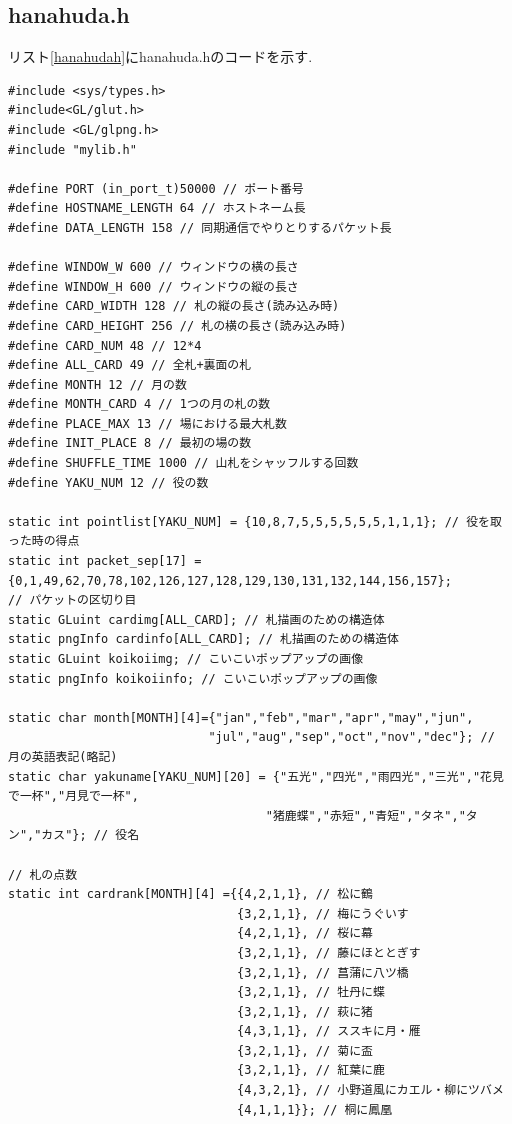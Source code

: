 \documentclass[a4j]{jarticle}
\begin{document}
    \subsection{hanahuda.h}
    リスト\ref{hanahudah}にhanahuda.hのコードを示す.
    \begin{lstlisting}[basicstyle=\ttfamily\footnotesize, frame=single,label=hanahudah,caption=hanahuda.h]
#include <sys/types.h>
#include<GL/glut.h>
#include <GL/glpng.h>
#include "mylib.h"

#define PORT (in_port_t)50000 // ポート番号
#define HOSTNAME_LENGTH 64 // ホストネーム長
#define DATA_LENGTH 158 // 同期通信でやりとりするパケット長

#define WINDOW_W 600 // ウィンドウの横の長さ
#define WINDOW_H 600 // ウィンドウの縦の長さ
#define CARD_WIDTH 128 // 札の縦の長さ(読み込み時)
#define CARD_HEIGHT 256 // 札の横の長さ(読み込み時)
#define CARD_NUM 48 // 12*4
#define ALL_CARD 49 // 全札+裏面の札
#define MONTH 12 // 月の数
#define MONTH_CARD 4 // 1つの月の札の数
#define PLACE_MAX 13 // 場における最大札数
#define INIT_PLACE 8 // 最初の場の数
#define SHUFFLE_TIME 1000 // 山札をシャッフルする回数
#define YAKU_NUM 12 // 役の数

static int pointlist[YAKU_NUM] = {10,8,7,5,5,5,5,5,5,1,1,1}; // 役を取った時の得点
static int packet_sep[17] ={0,1,49,62,70,78,102,126,127,128,129,130,131,132,144,156,157}; 
// パケットの区切り目  
static GLuint cardimg[ALL_CARD]; // 札描画のための構造体
static pngInfo cardinfo[ALL_CARD]; // 札描画のための構造体
static GLuint koikoiimg; // こいこいポップアップの画像
static pngInfo koikoiinfo; // こいこいポップアップの画像

static char month[MONTH][4]={"jan","feb","mar","apr","may","jun",
                            "jul","aug","sep","oct","nov","dec"}; // 月の英語表記(略記)
static char yakuname[YAKU_NUM][20] = {"五光","四光","雨四光","三光","花見で一杯","月見で一杯",
                                    "猪鹿蝶","赤短","青短","タネ","タン","カス"}; // 役名

// 札の点数
static int cardrank[MONTH][4] ={{4,2,1,1}, // 松に鶴
                                {3,2,1,1}, // 梅にうぐいす
                                {4,2,1,1}, // 桜に幕
                                {3,2,1,1}, // 藤にほととぎす
                                {3,2,1,1}, // 菖蒲に八ツ橋
                                {3,2,1,1}, // 牡丹に蝶
                                {3,2,1,1}, // 萩に猪
                                {4,3,1,1}, // ススキに月・雁
                                {3,2,1,1}, // 菊に盃
                                {3,2,1,1}, // 紅葉に鹿
                                {4,3,2,1}, // 小野道風にカエル・柳にツバメ
                                {4,1,1,1}}; // 桐に鳳凰


\end{lstlisting}
\end{document}
